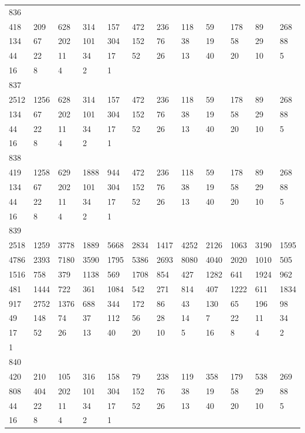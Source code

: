 \begin{longtable}{llllllllllll}
836&&&&&&&&&&&\\
418& 209& 628& 314& 157& 472& 236& 118& 59& 178& 89& 268\\
134& 67& 202& 101& 304& 152& 76& 38& 19& 58& 29& 88\\
44& 22& 11& 34& 17& 52& 26& 13& 40& 20& 10& 5\\
16& 8& 4& 2& 1& \\

837&&&&&&&&&&&\\
2512& 1256& 628& 314& 157& 472& 236& 118& 59& 178& 89& 268\\
134& 67& 202& 101& 304& 152& 76& 38& 19& 58& 29& 88\\
44& 22& 11& 34& 17& 52& 26& 13& 40& 20& 10& 5\\
16& 8& 4& 2& 1& \\

838&&&&&&&&&&&\\
419& 1258& 629& 1888& 944& 472& 236& 118& 59& 178& 89& 268\\
134& 67& 202& 101& 304& 152& 76& 38& 19& 58& 29& 88\\
44& 22& 11& 34& 17& 52& 26& 13& 40& 20& 10& 5\\
16& 8& 4& 2& 1& \\

839&&&&&&&&&&&\\
2518& 1259& 3778& 1889& 5668& 2834& 1417& 4252& 2126& 1063& 3190& 1595\\
4786& 2393& 7180& 3590& 1795& 5386& 2693& 8080& 4040& 2020& 1010& 505\\
1516& 758& 379& 1138& 569& 1708& 854& 427& 1282& 641& 1924& 962\\
481& 1444& 722& 361& 1084& 542& 271& 814& 407& 1222& 611& 1834\\
917& 2752& 1376& 688& 344& 172& 86& 43& 130& 65& 196& 98\\
49& 148& 74& 37& 112& 56& 28& 14& 7& 22& 11& 34\\
17& 52& 26& 13& 40& 20& 10& 5& 16& 8& 4& 2\\
1& \\

840&&&&&&&&&&&\\
420& 210& 105& 316& 158& 79& 238& 119& 358& 179& 538& 269\\
808& 404& 202& 101& 304& 152& 76& 38& 19& 58& 29& 88\\
44& 22& 11& 34& 17& 52& 26& 13& 40& 20& 10& 5\\
16& 8& 4& 2& 1& \\


\end{longtable}
